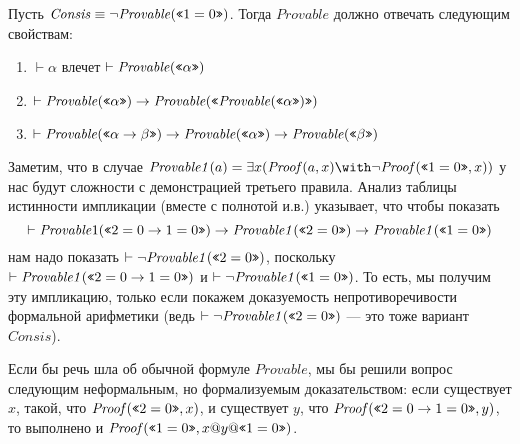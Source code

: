 Пусть $\mathit{Consis} \equiv \neg \mathit{Provable} (\texttt{<<}1=0\texttt{>>})$. Тогда $\mathit{Provable}$ должно отвечать следующим
свойствам:

\begin{enumerate}
\item $\vdash \alpha$ влечет $\vdash \mathit{Provable}(\texttt{<<}\alpha\texttt{>>})$
\item $\vdash \mathit{Provable} (\texttt{<<}\alpha\texttt{>>}) \rightarrow \mathit{Provable}(\texttt{<<}\mathit{Provable}(\texttt{<<}\alpha\texttt{>>})\texttt{>>})$
\item $\vdash \mathit{Provable} (\texttt{<<}\alpha\rightarrow \beta\texttt{>>})\rightarrow \mathit{Provable}(\texttt{<<}\alpha\texttt{>>}) \rightarrow \mathit{Provable}(\texttt{<<}\beta\texttt{>>})$
\end{enumerate}

Заметим, что в случае $\mathit{Provable1}(a) = \exists x (\mathit{Proof} (a,x) \with \neg \mathit{Proof} (\gq{1=0},x))$
у нас будут сложности с демонстрацией третьего правила. 
Анализ таблицы истинности импликации (вместе с полнотой и.в.)
указывает, что чтобы показать 
$$\vdash \mathit{Provable}1 (\texttt{<<}2=0\rightarrow 1=0\texttt{>>}) \rightarrow \mathit{Provable1} (\texttt{<<}2=0\texttt{>>}) \rightarrow \mathit{Provable1} (\texttt{<<}1=0\texttt{>>})$$
нам надо показать $\vdash \neg \mathit{Provable1} (\texttt{<<}2=0\texttt{>>})$,
поскольку $\vdash \mathit{Provable1} (\texttt{<<}2=0\rightarrow 1=0\texttt{>>})$ и $\vdash \neg \mathit{Provable1} (\texttt{<<}1=0\texttt{>>})$. 
То есть, мы получим эту импликацию, только если покажем доказуемость непротиворечивости формальной арифметики
(ведь $\vdash \neg \mathit{Provable1} (\texttt{<<}2=0\texttt{>>})$ --- это тоже вариант $\mathit{Consis}$).

Если бы речь шла об обычной формуле $\mathit{Provable}$, мы бы решили вопрос следующим неформальным, но формализуемым
доказательством:
если существует $x$, такой, что $\mathit{Proof} (\texttt{<<}2=0\texttt{>>},x)$, 
и существует $y$, что $\mathit{Proof}(\texttt{<<}2=0\rightarrow 1=0\texttt{>>},y)$, 
то выполнено и $\mathit{Proof} (\texttt{<<}1=0\texttt{>>},x @ y @ \texttt{<<}1=0\texttt{>>})$.


